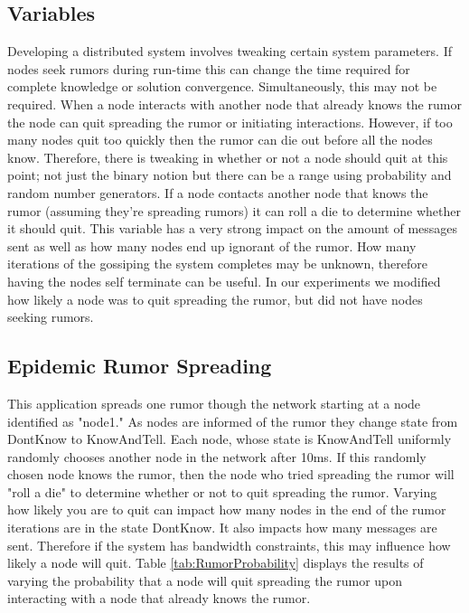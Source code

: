 \documentclass[11pt,twocolumn]{article}
\begin{document}
\subsection{Variables}

Developing a distributed system involves tweaking certain system parameters.  If nodes seek rumors during run-time this can change the time required for complete knowledge or solution convergence.  Simultaneously, this may not be required.  When a node interacts with another node that already knows the rumor the node can quit spreading the rumor or initiating interactions.  However, if too many nodes quit too quickly then the rumor can die out before all the nodes know.  Therefore, there is tweaking in whether or not a node should quit at this point; not just the binary notion but there can be a range using probability and random number generators.  If a node contacts another node that knows the rumor (assuming they're spreading rumors) it can roll a die to determine whether it should quit.  This variable has a very strong impact on the amount of messages sent as well as how many nodes end up ignorant of the rumor.  How many iterations of the gossiping the system completes may be unknown, therefore having the nodes self terminate can be useful.  In our experiments we modified how likely a node was to quit spreading the rumor, but did not have nodes seeking rumors.

\subsection{Epidemic Rumor Spreading}

This application spreads one rumor though the network starting at a node identified as "node1."  As nodes are informed of the rumor they change state from DontKnow to KnowAndTell.  Each node, whose state is KnowAndTell uniformly randomly chooses another node in the network after 10ms.  If this randomly chosen node knows the rumor, then the node who tried spreading the rumor will "roll a die" to determine whether or not to quit spreading the rumor.  Varying how likely you are to quit can impact how many nodes in the end of the rumor iterations are in the state DontKnow.  It also impacts how many messages are sent.  Therefore if the system has bandwidth constraints, this may influence how likely a node will quit.  Table \ref{tab:RumorProbability} displays the results of varying the probability that a node will quit spreading the rumor upon interacting with a node that already knows the rumor.
\end{document}
